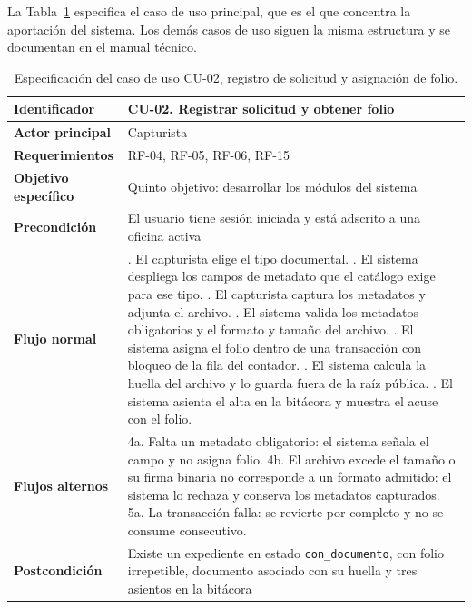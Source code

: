 La Tabla~\ref{tab:cu_registro} especifica el caso de uso principal, que es el que concentra la aportación del sistema. Los demás casos de uso siguen la misma estructura y se documentan en el manual técnico.

\begin{table}[H]
  \centering
  \small
  \renewcommand{\arraystretch}{1.3}
  \caption{Especificación del caso de uso CU-02, registro de solicitud y asignación de folio.}
  \label{tab:cu_registro}
  \begin{tabularx}{\textwidth}{@{}>{\raggedright\arraybackslash}p{2.9cm}>{\raggedright\arraybackslash}X@{}}
    \toprule
    \textbf{Identificador} & CU-02. Registrar solicitud y obtener folio \\
    \midrule
    \textbf{Actor principal} & Capturista \\
    \textbf{Requerimientos} & RF-04, RF-05, RF-06, RF-15 \\
    \textbf{Objetivo específico} & Quinto objetivo: desarrollar los módulos del sistema \\
    \textbf{Precondición} & El usuario tiene sesión iniciada y está adscrito a una oficina activa \\
    \textbf{Flujo normal} &
      1. El capturista elige el tipo documental. \newline
      2. El sistema despliega los campos de metadato que el catálogo exige para ese tipo. \newline
      3. El capturista captura los metadatos y adjunta el archivo. \newline
      4. El sistema valida los metadatos obligatorios y el formato y tamaño del archivo. \newline
      5. El sistema asigna el folio dentro de una transacción con bloqueo de la fila del contador. \newline
      6. El sistema calcula la huella del archivo y lo guarda fuera de la raíz pública. \newline
      7. El sistema asienta el alta en la bitácora y muestra el acuse con el folio. \\
    \textbf{Flujos alternos} &
      4a. Falta un metadato obligatorio: el sistema señala el campo y no asigna folio. \newline
      4b. El archivo excede el tamaño o su firma binaria no corresponde a un formato admitido: el sistema lo rechaza y conserva los metadatos capturados. \newline
      5a. La transacción falla: se revierte por completo y no se consume consecutivo. \\
    \textbf{Postcondición} & Existe un expediente en estado \texttt{con\_documento}, con folio irrepetible, documento asociado con su huella y tres asientos en la bitácora \\
    \bottomrule
  \end{tabularx}
\end{table}



